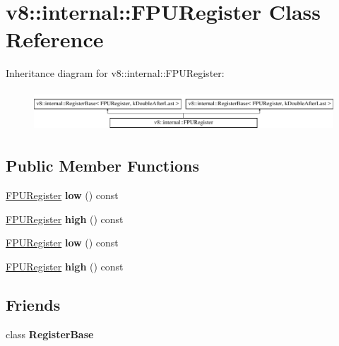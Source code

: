 \hypertarget{classv8_1_1internal_1_1FPURegister}{}\section{v8\+:\+:internal\+:\+:F\+P\+U\+Register Class Reference}
\label{classv8_1_1internal_1_1FPURegister}
Inheritance diagram for v8\+:\+:internal\+:\+:F\+P\+U\+Register\+:\begin{figure}[H]
\begin{center}
\leavevmode
\includegraphics[height=1.546961cm]{classv8_1_1internal_1_1FPURegister}
\end{center}
\end{figure}
\subsection*{Public Member Functions}
\begin{DoxyCompactItemize}
\item 
\mbox{\label{classv8_1_1internal_1_1FPURegister_a54e5f7182dff1c75f6d8db707ddf6b63}} 
\mbox{\hyperlink{classv8_1_1internal_1_1FPURegister}{F\+P\+U\+Register}} {\bfseries low} () const
\item 
\mbox{\label{classv8_1_1internal_1_1FPURegister_a5a155a035e6976cf31d6bdd56a6178fb}} 
\mbox{\hyperlink{classv8_1_1internal_1_1FPURegister}{F\+P\+U\+Register}} {\bfseries high} () const
\item 
\mbox{\label{classv8_1_1internal_1_1FPURegister_a54e5f7182dff1c75f6d8db707ddf6b63}} 
\mbox{\hyperlink{classv8_1_1internal_1_1FPURegister}{F\+P\+U\+Register}} {\bfseries low} () const
\item 
\mbox{\label{classv8_1_1internal_1_1FPURegister_a5a155a035e6976cf31d6bdd56a6178fb}} 
\mbox{\hyperlink{classv8_1_1internal_1_1FPURegister}{F\+P\+U\+Register}} {\bfseries high} () const
\end{DoxyCompactItemize}
\subsection*{Friends}
\begin{DoxyCompactItemize}
\item 
\mbox{\label{classv8_1_1internal_1_1FPURegister_a960d84c54d6f69c7f2d3cf54e7fd6938}} 
class {\bfseries Register\+Base}
\end{DoxyCompactItemize}
